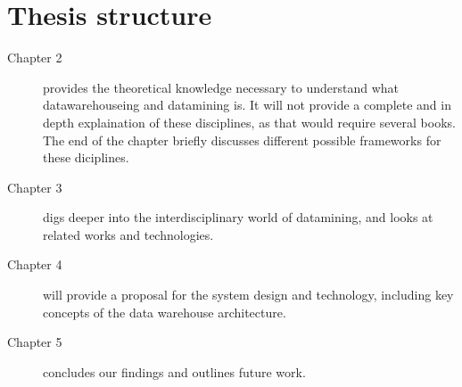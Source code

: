 \section{Thesis structure}
	
		\begin{description}
			\item[Chapter 2] provides the theoretical knowledge necessary to understand what datawarehouseing and datamining is. 
				It will not provide a complete and in depth explaination of these disciplines, as that would require several books.
				The end of the chapter briefly discusses different possible frameworks for these diciplines.
			\item[Chapter 3] digs deeper into the interdisciplinary world of datamining, and looks at related works and technologies.
			\item[Chapter 4] will provide a proposal for the system design and technology, 
				including key concepts of the data warehouse architecture.
			\item[Chapter 5] concludes our findings and outlines future work.
				
		\end{description}